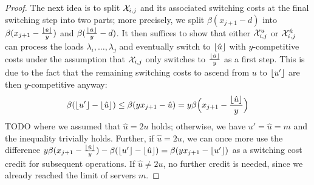 \begin{proof}
The next idea is to split $\mathcal{X}_{i,j}$ and its associated switching costs at the final switching step into two parts; more precisely, we split $\beta(x_{j+1}-d)$ into $\beta(x_{j+1}-\frac{\lfloor\hat{u}\rfloor}{y})$ and $\beta(\frac{\lfloor\hat{u}\rfloor}{y}-d)$. It then suffices to show that either $\mathcal{X}_{i,j}^u$ or $\mathcal{X}_{i,j}^{\hat{u}}$ can process the loads $\lambda_i,\dotsc,\lambda_j$ and eventually switch to $\lfloor\hat{u}\rfloor$ with $y$-competitive costs under the assumption that $\mathcal{X}_{i,j}$ only switches to $\frac{\lfloor\hat{u}\rfloor}{y}$ as a first step. This is due to the fact that the remaining switching costs to ascend from $u$ to $\lfloor u'\rfloor$ are then $y$-competitive anyway:
\begin{equation*}
	\beta(\lfloor u'\rfloor-\lfloor\hat{u}\rfloor)\le\beta(yx_{j+1}-\hat{u})=y\beta\Bigl(x_{j+1}-\frac{\lfloor\hat{u}\rfloor}{y}\Bigr)
\end{equation*}
TODO where we assumed that $\hat{u}=2u$ holds; otherwise, we have $u'=\hat{u}=m$ and the inequality trivially holds. Further, if $\hat{u}=2u$, we can once more use the difference $y\beta(x_{j+1}-\frac{\lfloor\hat{u}\rfloor}{y})-\beta(\lfloor u'\rfloor-\lfloor\hat{u}\rfloor)=\beta(yx_{j+1}-\lfloor u'\rfloor)$ as a switching cost credit for subsequent operations. If $\hat{u}\neq2u$, no further credit is needed, since we already reached the limit of servers $m$.


\end{proof}

